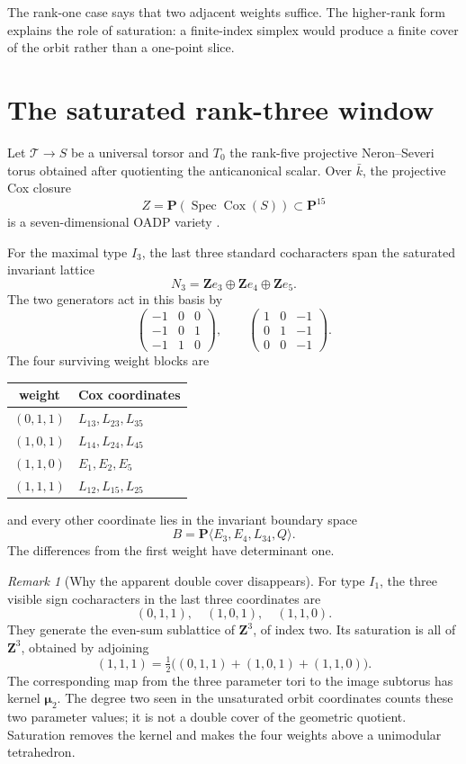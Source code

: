 \documentclass[11pt]{article}
\theoremstyle{remark}
\newtheorem{remark}[theorem]{Remark}
\newcommand{\PP}{\mathbf P}
\newcommand{\Z}{\mathbf Z}
\newcommand{\Spec}{\operatorname{Spec}}
\begin{document}
The rank-one case says that two adjacent weights suffice.  The higher-rank
form explains the role of saturation: a finite-index simplex would produce a
finite cover of the orbit rather than a one-point slice.

\section{The saturated rank-three window}

Let \(\mathcal T\to S\) be a universal torsor and \(T_0\) the rank-five
projective Neron--Severi torus obtained after quotienting the anticanonical
scalar.  Over \(\bar k\), the projective Cox closure
\[
 Z=\PP(\Spec\operatorname{Cox}(S))\subset\PP^{15}
\]
is a seven-dimensional OADP variety \cite[Lemma~3.2]{TZ}.

For the maximal type \(I_3\), the last three standard cocharacters span the
saturated invariant lattice
\[
 N_3=\Z e_3\oplus\Z e_4\oplus\Z e_5.
\]
The two generators act in this basis by
\[
 \begin{pmatrix}-1&0&0\\-1&0&1\\-1&1&0\end{pmatrix},
 \qquad
 \begin{pmatrix}1&0&-1\\0&1&-1\\0&0&-1\end{pmatrix}.
\]
The four surviving weight blocks are
\begin{center}
\begin{tabular}{@{}cl@{}}
\toprule
weight & Cox coordinates\\
\midrule
\((0,1,1)\) & \(L_{13},L_{23},L_{35}\)\\
\((1,0,1)\) & \(L_{14},L_{24},L_{45}\)\\
\((1,1,0)\) & \(E_1,E_2,E_5\)\\
\((1,1,1)\) & \(L_{12},L_{15},L_{25}\)\\
\bottomrule
\end{tabular}
\end{center}
and every other coordinate lies in the invariant boundary space
\[
 B=\PP\langle E_3,E_4,L_{34},Q\rangle.
\]
The differences from the first weight have determinant one.

\begin{remark}[Why the apparent double cover disappears]
\label{rem:saturation}
%
For type \(I_1\), the three visible sign cocharacters in the last three
coordinates are
\[
 (0,1,1),\quad(1,0,1),\quad(1,1,0).
\]
They generate the even-sum sublattice of \(\Z^3\), of index two.  Its
saturation is all of \(\Z^3\), obtained by adjoining
\[
 (1,1,1)=\tfrac12\bigl((0,1,1)+(1,0,1)+(1,1,0)\bigr).
\]
The corresponding map from the three parameter tori to the image subtorus
has kernel \(\boldsymbol\mu_2\).  The degree two seen in the unsaturated orbit
coordinates counts these two parameter values; it is not a double cover of
the geometric quotient.  Saturation removes the kernel and makes the four
weights above a unimodular tetrahedron.
\end{remark}
\end{document}
